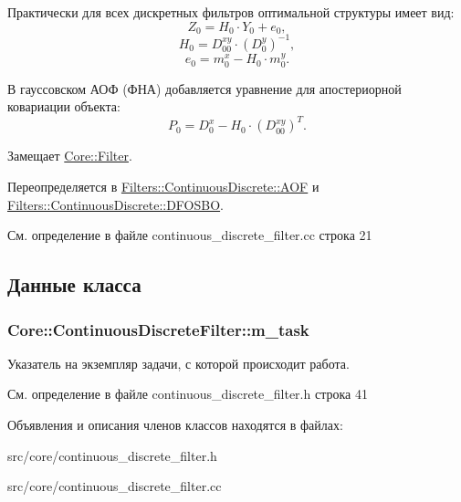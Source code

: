 Практически для всех дискретных фильтров оптимальной структуры имеет вид\+: \[Z_0 = H_0 \cdot Y_0 + e_0,\] \[H_0 = D_{00}^{xy} \cdot (D_0^y)^{-1},\] \[e_0 = m_0^x - H_0 \cdot m_0^y.\]

В гауссовском АОФ (ФНА) добавляется уравнение для апостериорной ковариации объекта\+: \[P_0 = D_0^x - H_0 \cdot (D_{00}^{xy})^T.\] 

Замещает \hyperlink{class_core_1_1_filter_af95880b734c4b8dc3d8c02f222b32506}{Core\+::\+Filter}.



Переопределяется в \hyperlink{class_filters_1_1_continuous_discrete_1_1_a_o_f_ab350a4de87a9e2c2e8b01e178d61f3b5}{Filters\+::\+Continuous\+Discrete\+::\+A\+OF} и \hyperlink{class_filters_1_1_continuous_discrete_1_1_d_f_o_s_b_o_a958c75df5031558a244d553f13376e75}{Filters\+::\+Continuous\+Discrete\+::\+D\+F\+O\+S\+BO}.



См. определение в файле continuous\+\_\+discrete\+\_\+filter.\+cc строка 21



\subsection{Данные класса}
\subsubsection[{\texorpdfstring{m\+\_\+task}{m_task}}]{ Core\+::\+Continuous\+Discrete\+Filter\+::m\+\_\+task\hspace{0.3cm}{\ttfamily [protected]}}\hypertarget{class_core_1_1_continuous_discrete_filter_a14b9176c461ca407005e653ecc987b1b}{}\label{class_core_1_1_continuous_discrete_filter_a14b9176c461ca407005e653ecc987b1b}
Указатель на экземпляр задачи, с которой происходит работа. 

См. определение в файле continuous\+\_\+discrete\+\_\+filter.\+h строка 41



Объявления и описания членов классов находятся в файлах\+:\begin{DoxyCompactItemize}
\item 
src/core/continuous\+\_\+discrete\+\_\+filter.\+h\item 
src/core/continuous\+\_\+discrete\+\_\+filter.\+cc\end{DoxyCompactItemize}
